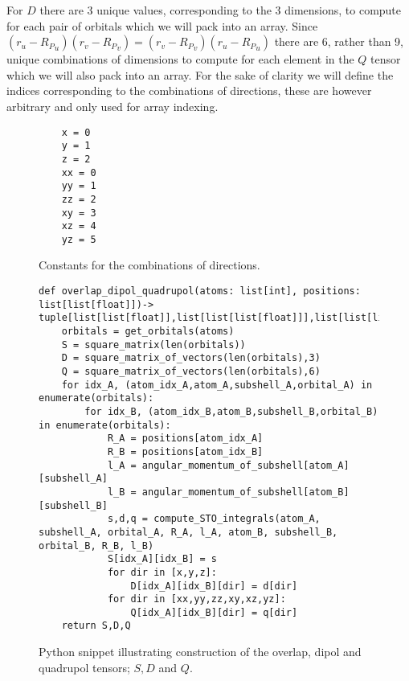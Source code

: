 For $D$ there are 3 unique values, corresponding to the 3 dimensions, to compute for each pair of orbitals which we will pack into an array. 
Since $(r_u-{R_P}_u)(r_v-{R_P}_v)=(r_v-{R_P}_v)(r_u-{R_P}_u)$ there are 6, rather than 9, unique combinations of dimensions to compute for each element in the $Q$ tensor which we will also pack into an array.
For the sake of clarity we will define the indices corresponding to the combinations of directions, these are however arbitrary and only used for array indexing.  
\begin{figure}[H]
\begin{verbatim}
    x = 0
    y = 1
    z = 2
    xx = 0
    yy = 1
    zz = 2
    xy = 3
    xz = 4
    yz = 5
\end{verbatim}
\caption{Constants for the combinations of directions.}
\end{figure}
\begin{figure}[H]
\begin{verbatim}
def overlap_dipol_quadrupol(atoms: list[int], positions: list[list[float]])-> tuple[list[list[float]],list[list[list[float]]],list[list[list[float]]]]:
    orbitals = get_orbitals(atoms)
    S = square_matrix(len(orbitals))
    D = square_matrix_of_vectors(len(orbitals),3)
    Q = square_matrix_of_vectors(len(orbitals),6)
    for idx_A, (atom_idx_A,atom_A,subshell_A,orbital_A) in enumerate(orbitals):
        for idx_B, (atom_idx_B,atom_B,subshell_B,orbital_B) in enumerate(orbitals):
            R_A = positions[atom_idx_A]
            R_B = positions[atom_idx_B]
            l_A = angular_momentum_of_subshell[atom_A][subshell_A]
            l_B = angular_momentum_of_subshell[atom_B][subshell_B]
            s,d,q = compute_STO_integrals(atom_A, subshell_A, orbital_A, R_A, l_A, atom_B, subshell_B, orbital_B, R_B, l_B)
            S[idx_A][idx_B] = s
            for dir in [x,y,z]:
                D[idx_A][idx_B][dir] = d[dir]
            for dir in [xx,yy,zz,xy,xz,yz]:
                Q[idx_A][idx_B][dir] = q[dir]
    return S,D,Q
\end{verbatim}
\caption{Python snippet illustrating construction of the overlap, dipol and quadrupol tensors; $S,D$ and $Q$.}
\end{figure}

